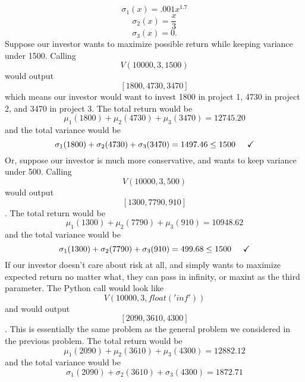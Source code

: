 \documentclass{article}
\begin{document}
$$\sigma_{1}(x) = .001x^{1.7}$$
$$\sigma_{2}(x) = \dfrac{x}{3}$$
$$\sigma_{3}(x) = 0.$$
Suppose our investor wants to maximize possible return while keeping variance under 1500.
Calling $$V(10000, 3, 1500)$$ would output $$[1800, 4730, 3470]$$ which means our investor would want to invest 1800 in project 1, 4730 in project 2, and 3470 in project 3. 
\newline The total return would be $$\mu_{1}(1800) + \mu_{2}(4730) + \mu_{3}(3470) = 12745.20 $$ and the total variance would be $$\sigma_{1}(1800) + \sigma_{2}(4730) + \sigma_{3}(3470) = 1497.46 \leq 1500 \hspace{.5cm} \checkmark$$
\newline
Or, suppose our investor is much more conservative, and wants to keep variance under 500.  Calling $$V(10000, 3, 500)$$ would output $$[1300, 7790, 910]$$. 
\newline The total return would be $$\mu_{1}(1300) + \mu_{2}(7790) + \mu_{3}(910) = 10948.62 $$ and the total variance would be $$\sigma_{1}(1300) + \sigma_{2}(7790) + \sigma_{3}(910) = 499.68 \leq 1500 \hspace{.5cm} \checkmark$$
\newline
If our investor doesn't care about risk at all, and simply wants to maximize expected return no matter what, they can pass in infinity, or maxint as the third parameter.  The Python call would look like $$V(10000, 3, float('inf'))$$ and would output $$[2090, 3610, 4300]$$. This is essentially the same problem as the general problem we considered in the previous problem.  
The total return would be $$\mu_{1}(2090) + \mu_{2}(3610) + \mu_{3}(4300) = 12882.12 $$ and the total variance would be $$\sigma_{1}(2090) + \sigma_{2}(3610) + \sigma_{3}(4300) = 1872.71 $$
\end{document}
